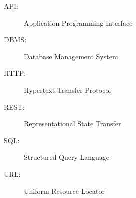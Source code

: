 \label{sec:abkuerzungsverzeichnis}

\begin{description}
  	\item[API:] Application Programming Interface
	\item[DBMS:] Database Management System
	\item[HTTP:] Hypertext Transfer Protocol
	\item[REST:] Representational State Transfer
	\item[SQL:]Structured Query Language
	\item[URL:] Uniform Resource Locator
\end{description}

